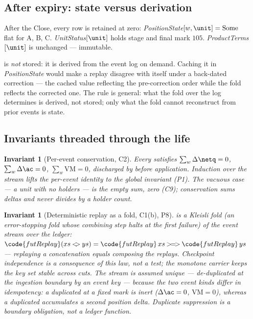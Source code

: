 \documentclass[11pt,a4paper]{article}
\newtheorem{invariant}[definition]{Invariant}
\begin{document}
\subsection{After expiry: state versus derivation}

After the Close, every row is retained at zero: \emph{PositionState}$[w,\unit]=\mathrm{Some}$ flat for
A, B, C. \emph{UnitStatus}$[\unit]$ holds stage  and final mark $105$.
\emph{ProductTerms}$[\unit]$ is unchanged --- immutable.

 is \emph{not} stored: it is derived from the event log on demand. Caching it
in \emph{PositionState} would make a replay disagree with itself under a back-dated correction --- the
cached value reflecting the pre-correction order while the fold reflects the corrected one. The rule
is general: what the fold over the log determines is derived, not stored; only what the fold cannot
reconstruct from prior events is state.

\subsection{Invariants threaded through the life}
\label{sec:futures-invariants}

\begin{invariant}[Per-event conservation, C2]
Every  satisfies $\sum_w\Delta\netq=0$, $\sum_w\Delta\ac=0$, $\sum_w\mathrm{VM}=0$,
discharged by  before application. Induction over the stream lifts the per-event
identity to the global invariant (P1). The vacuous case --- a unit with no holders --- is the empty
sum, zero (C9); conservation sums deltas and never divides by a holder count.
\end{invariant}

\begin{invariant}[Deterministic replay as a fold, C1(b), P8]
 is a Kleisli fold (an error-stopping fold whose combining step halts at the first failure) of the event stream over the ledger:
$\code{futReplay}(xs\mathbin{<\!\!>}ys)=\code{futReplay}\,xs \mathbin{>\!=\!>} \code{futReplay}\,ys$ ---
replaying a concatenation equals composing the replays. Checkpoint independence is a consequence of
this law, not a test; the monotone carrier keeps the key set stable across cuts. The stream is assumed
\emph{unique} --- de-duplicated at the ingestion boundary by an event key --- because the two event
kinds differ in idempotency: a duplicated  at a fixed mark is inert ($\Delta\ac=0$,
$\mathrm{VM}=0$), whereas a duplicated  accumulates a second position delta. Duplicate
suppression is a boundary obligation, not a ledger function.
\end{invariant}
\end{document}
